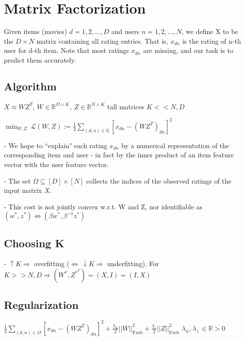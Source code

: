 \section*{Matrix Factorization}

Given items (movies) $d=1, 2, . . . , D$ and users $n= 1, 2, . . . , N$, we define X to be the $D \times N$ matrix containing all rating entries. That is, $x_{dn}$ is the rating of n-th user for d-th item.
Note that most ratings $x_{dn}$ are missing, and our task is to predict them accurately.

\subsection*{Algorithm}

$X \approx WZ^T$, $W \in \mathbb{R}^{D \times K}, \ Z \in \mathbb{R}^{N \times K}$ tall matrices $K << N, D$

$\operatorname*{min}_{W,Z}~{\mathcal{L}}(W,Z):=\frac{1}{2}\sum_{(d,n)\in\mathbb{Q}} [x_{dn}-(WZ^T)_{dn}]^2$

- We hope to ``explain" each rating $x_{dn}$ by a numerical representation of the corresponding item and user - in fact by the inner product of an item feature vector with the user feature vector.



- The set $\Omega\subseteq\left[D\right]\times\left[N\right]$ collects the indices of the observed ratings of the input matrix $X$.

- This cost is not jointly convex w.r.t. W and Z, nor identifiable as $(w^*, z^*) \Leftrightarrow (\beta w^*, \beta^{-1} z^*)$

\subsection*{Choosing K}

- $\uparrow K \Rightarrow$ overfitting ($\Leftrightarrow \ \downarrow K \Rightarrow$ underfitting). 
For $K >> N,D \Rightarrow (W^*, Z^{*^T}) = (X, I) = (I, X)$

\subsection*{Regularization}

$\frac{1}{2}\sum_{(d,n)\in\Omega}[x_{d n}-(W Z^{T})_{d n}]^{2}+\frac{\lambda_{w}}{2}||{W}||_{\mathrm{Frob}}^{2}+\frac{\lambda_{z}}{2}||{Z}||_{\mathrm{Frob}}^{2}$
$\lambda_{w},\lambda_{z}\, \in \mathbb{R} > 0$


